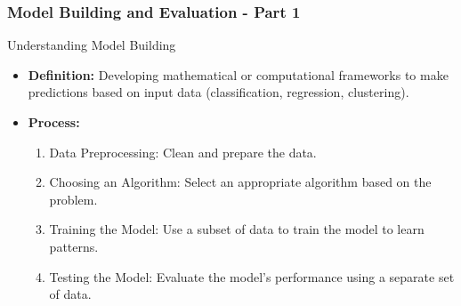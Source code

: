 \documentclass{beamer}
\begin{document}
\begin{frame}[fragile]
    \frametitle{Model Building and Evaluation - Part 1}
    \begin{block}{Understanding Model Building}
        \begin{itemize}
            \item \textbf{Definition:} Developing mathematical or computational frameworks to make predictions based on input data (classification, regression, clustering).
            \item \textbf{Process:}
            \begin{enumerate}
                \item Data Preprocessing: Clean and prepare the data.
                \item Choosing an Algorithm: Select an appropriate algorithm based on the problem.
                \item Training the Model: Use a subset of data to train the model to learn patterns.
                \item Testing the Model: Evaluate the model's performance using a separate set of data.
            \end{enumerate}
        \end{itemize}
    \end{block}
\end{frame}
\end{document}

